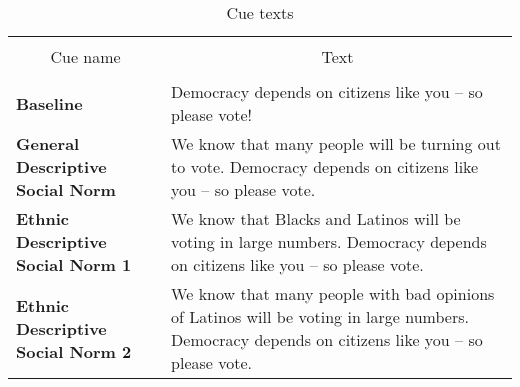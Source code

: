 \begin{table}[h]
  \centering
  \caption{Cue texts \label{tab:treatments}}
  \begin{tabular}{l p{8cm}}
    \\ \hline \hline \\[-1.8ex] 
    \multicolumn{1}{c}{Cue name} & \multicolumn{1}{c}{Text} \\
    \hline \\[-1.8ex]
    \textbf{Baseline} & Democracy depends
                           on citizens like you -- so please vote! \\[0.8ex] 
    \textbf{General Descriptive Social Norm} & We know that many
                               people will be turning out to vote. Democracy depends on citizens like
                               you -- so please vote.  \\[0.8ex]
    \textbf{Ethnic Descriptive Social Norm 1}  & We know that Blacks
                              and Latinos will be voting in large numbers. Democracy depends on
                              citizens like you -- so please vote.  \\[0.8ex]
    \textbf{Ethnic Descriptive Social Norm 2} & We know that many
                               people with bad opinions of Latinos will be voting in large numbers.
                               Democracy depends on citizens like you -- so please vote.  \\
    \hline
  \end{tabular}
\end{table}
